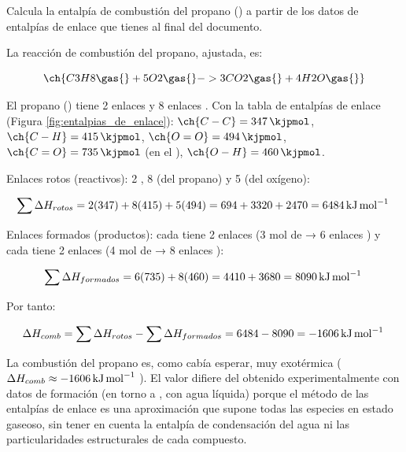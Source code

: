 \begin{exercise}
    Calcula la entalpía de combustión del propano () a partir de los datos de entalpías de enlace que tienes al final del documento.

    \begin{solu}

        La reacción de combustión del propano, ajustada, es:

        \begin{equation*}
            \ch{C3H8 \gas{} + 5 O2 \gas{} -> 3 CO2 \gas{} + 4 H2O \gas{}}
        \end{equation*}

        El propano () tiene 2 enlaces  y 8 enlaces . Con la tabla de entalpías de enlace (Figura \ref{fig:entalpias_de_enlace}): \(\ch{C-C} = \SI{347}{\kjpmol}\), \(\ch{C-H} = \SI{415}{\kjpmol}\), \(\ch{O=O} = \SI{494}{\kjpmol}\), \(\ch{C=O} = \SI{735}{\kjpmol}\) (en el ), \(\ch{O-H} = \SI{460}{\kjpmol}\).

        Enlaces rotos (reactivos): 2 , 8  (del propano) y 5  (del oxígeno):

        \begin{equation*}
            \sum \Delta H_{rotos} = 2(347) + 8(415) + 5(494) = 694 + 3320 + 2470 = \energia[kjmol]{6484}
        \end{equation*}

        Enlaces formados (productos): cada  tiene 2 enlaces  (3 mol de  → 6 enlaces ) y cada  tiene 2 enlaces  (4 mol de  → 8 enlaces ):

        \begin{equation*}
            \sum \Delta H_{formados} = 6(735) + 8(460) = 4410 + 3680 = \energia[kjmol]{8090}
        \end{equation*}

        Por tanto:

        \begin{equation*}
            \Delta H_{comb} = \sum \Delta H_{rotos} - \sum \Delta H_{formados} = 6484 - 8090 = \energia[kjmol]{-1606}
        \end{equation*}

        La combustión del propano es, como cabía esperar, muy exotérmica (\(\Delta H_{comb} \approx \energia[kjmol]{-1606}\)). El valor difiere del obtenido experimentalmente con datos de formación (en torno a , con agua líquida) porque el método de las entalpías de enlace es una aproximación que supone todas las especies en estado gaseoso, sin tener en cuenta la entalpía de condensación del agua ni las particularidades estructurales de cada compuesto.

    \end{solu}
\end{exercise}

